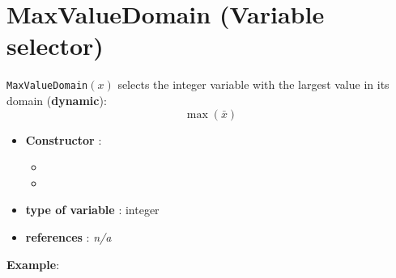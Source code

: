 \section{MaxValueDomain (Variable selector)}\label{maxvaldomain:maxvaldomainvarselector}\hypertarget{maxvaldomain:maxvaldomainvarselector}{}
\begin{notedef}
  \texttt{MaxValueDomain}$(x)$ selects the integer variable with the largest value in its domain (\textbf{dynamic}):
$$\max(\bar{x})$$
\end{notedef}

\begin{itemize}
	\item \textbf{Constructor} : 
	\begin{itemize}
	\item {}
	\item {}
	\end{itemize}	
	\item \textbf{type of variable} : integer
	\item \textbf{references} : \emph{n/a}
\end{itemize}

\textbf{Example}:
%

